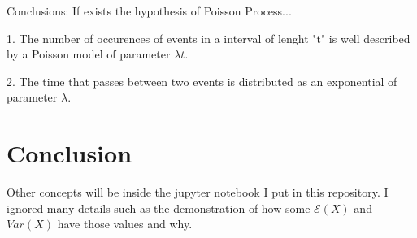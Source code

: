 \documentclass{article}
\begin{document}
Conclusions: If exists the hypothesis of Poisson Process...

\bigskip

1. The number of occurences of events in a interval of lenght "t" is well described by a Poisson model of parameter $\lambda t$.

2. The time that passes between two events is distributed as an exponential of parameter $\lambda$.

\section{Conclusion}

Other concepts will be inside the jupyter notebook I put in this repository.
I ignored many details such as the demonstration of how some $\mathcal E(X)$ and $Var(X)$ have those values and why.
\end{document}
